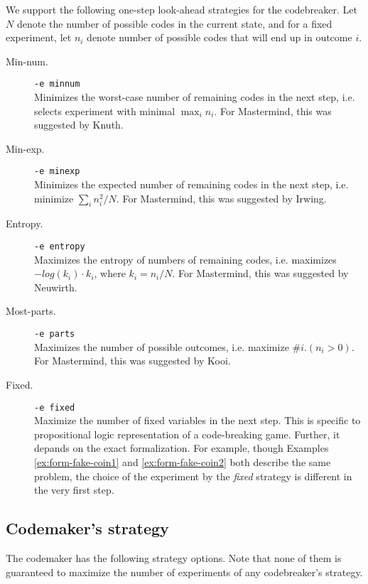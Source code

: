 We support the following one-step look-ahead strategies for the codebreaker.
Let $N$ denote the number of possible codes in the current state,
and for a fixed experiment, let $n_i$ denote number of possible codes that
will end up in outcome $i$.

\begin{description}
\item[Min-num.] \texttt{-e minnum} \\
  Minimizes the worst-case number of remaining codes
  in the next step, i.e. selects experiment with minimal $\max_i n_i$.
  For Mastermind, this was suggested by Knuth\cite{mm-knuth}.
\item[Min-exp.]  \texttt{-e minexp} \\
   Minimizes the expected number of remaining codes
  in the next step, i.e. minimize $\sum_in_i^2/N$.
  For Mastermind, this was suggested by Irwing\cite{mm-expnum}.
\item[Entropy.] \texttt{-e entropy} \\
  Maximizes the entropy of numbers of remaining codes,
  i.e. maximizes $-log(k_i)\cdot k_i$, where $k_i=n_i/N$.
  For Mastermind, this was suggested by Neuwirth\cite{mm-entropy}.
\item[Most-parts.] \texttt{-e parts} \\
  Maximizes the number of possible outcomes,
  i.e. maximize $\# i. (n_i > 0)$.
  For Mastermind, this was suggested by Kooi\cite{mm-mostparts}.
\item[Fixed.] \texttt{-e fixed} \\
  Maximize the number of fixed variables
  in the next step.
  This is specific to propositional logic representation of a code-breaking game.
  Further, it depands on the exact formalization.
  For example, though Examples \ref{ex:form-fake-coin1}
  and \ref{ex:form-fake-coin2} both describe the same problem,
  the choice of the experiment by the \emph{fixed} strategy is
  different in the very first step.
\end{description}

\subsection{Codemaker's strategy}

The codemaker has the following strategy options.
Note that none of them is guaranteed to maximize the
  number of experiments of any codebreaker's strategy.

